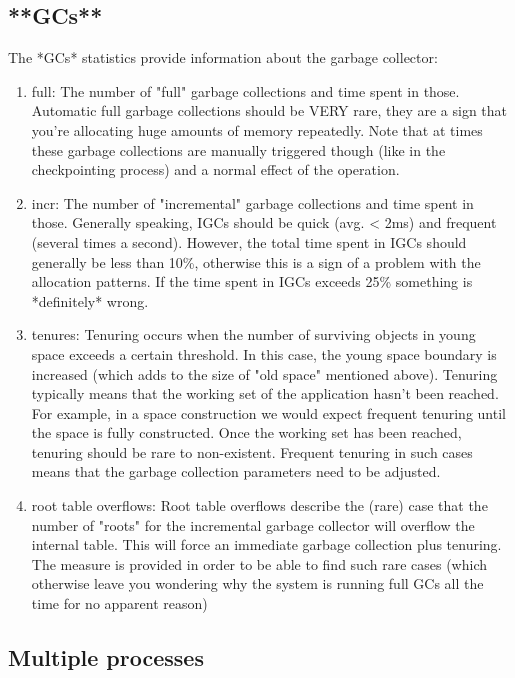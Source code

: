 \documentclass[a4paper,10pt,twoside]{book}
\begin{document}
\subsection{**GCs**}

The *GCs* statistics provide information about the garbage collector:

\begin{enumerate}
\item full: The number of "full" garbage collections and time spent in
those. Automatic full garbage collections should be VERY rare, they are
a sign that you're allocating huge amounts of memory repeatedly. Note
that at times these garbage collections are manually triggered though
(like in the checkpointing process) and a normal effect of the operation.

\item incr: The number of "incremental" garbage collections and time spent
in those. Generally speaking, IGCs should be quick (avg. < 2ms) and
frequent (several times a second). However, the total time spent in IGCs
should generally be less than 10\%, otherwise this is a sign of a problem
with the allocation patterns. If the time spent in IGCs exceeds 25\%
something is *definitely* wrong.

\item tenures: Tenuring occurs when the number of surviving objects in young
space exceeds a certain threshold. In this case, the young space
boundary is increased (which adds to the size of "old space" mentioned
above). Tenuring typically means that the working set of the application
hasn't been reached. For example, in a space construction we would
expect frequent tenuring until the space is fully constructed. Once the
working set has been reached, tenuring should be rare to non-existent.
Frequent tenuring in such cases means that the garbage collection
parameters need to be adjusted.

\item root table overflows: Root table overflows describe the (rare) case
that the number of "roots" for the incremental garbage collector will
overflow the internal table. This will force an immediate garbage
collection plus tenuring. The measure is provided in order to be able to
find such rare cases (which otherwise leave you wondering why the system
is running full GCs all the time for no apparent reason)
\end{enumerate}


\subsection{Multiple processes}
\end{document}
